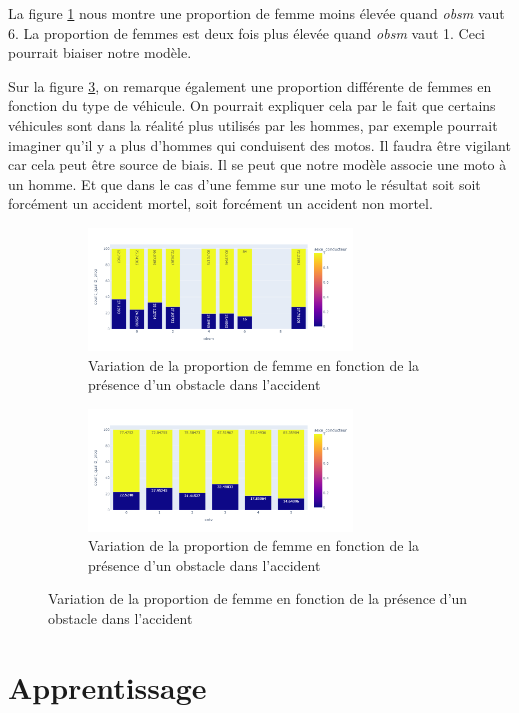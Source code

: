 \documentclass{article}
\begin{document}
    La figure \ref{fig:fig_sexe_bivar1} nous montre une proportion de femme moins élevée quand \textit{obsm} vaut 
    6. La proportion de femmes est deux fois plus élevée quand \textit{obsm} vaut 1. Ceci pourrait biaiser notre 
    modèle.
    
    Sur la figure \ref{fig:fig_sexe_bivar2}, on remarque également une proportion différente de femmes 
    en fonction du type de véhicule. On pourrait expliquer cela par le fait que certains véhicules sont 
    dans la réalité plus utilisés par les hommes, par exemple pourrait imaginer qu'il y a plus d'hommes qui 
    conduisent des motos. Il faudra être vigilant car cela peut être source de biais. Il se peut que notre 
    modèle associe une moto à un homme. Et que dans le cas d'une femme sur une moto le résultat soit soit 
    forcément un accident mortel, soit forcément un accident non mortel.

    \begin{figure}[h]
        \centering
        \begin{subfigure}{7cm}
            \includegraphics[width=7cm]{./img/bivar_sexe.png}
            \caption{Variation de la proportion de femme en fonction de la présence d'un obstacle dans l'accident}
            \label{fig:fig_sexe_bivar1}
        \end{subfigure}
        \hspace{0.2cm}
        \begin{subfigure}{7cm}
            \includegraphics[width=7cm]{./img/bivar_sexe2.png}
        \caption{Variation de la proportion de femme en fonction de la présence d'un obstacle dans l'accident}
        \label{fig:fig_sexe_bivar2}
        \end{subfigure}
    \end{figure}

    \section{Apprentissage}
    
\end{document}
